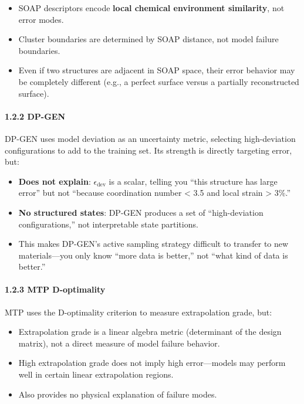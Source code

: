 \documentclass[
  12pt,
]{article}
\providecommand{\tightlist}{%
  \setlength{\itemsep}{0pt}\setlength{\parskip}{0pt}}
\begin{document}
\begin{itemize}
\tightlist
\item
  SOAP descriptors encode \textbf{local chemical environment similarity}, not error modes.
\item
  Cluster boundaries are determined by SOAP distance, not model failure boundaries.
\item
  Even if two structures are adjacent in SOAP space, their error behavior may be completely different (e.g., a perfect surface versus a partially reconstructed surface).
\end{itemize}

\paragraph{1.2.2 DP-GEN}\label{dp-gen}

DP-GEN uses model deviation as an uncertainty metric, selecting high-deviation configurations to add to the training set. Its strength is directly targeting error, but:

\begin{itemize}
\tightlist
\item
  \textbf{Does not explain}: $\epsilon_{\text{dev}}$ is a scalar, telling you ``this structure has large error'' but not ``because coordination number < 3.5 and local strain > 3\%.''
\item
  \textbf{No structured states}: DP-GEN produces a set of ``high-deviation configurations,'' not interpretable state partitions.
\item
  This makes DP-GEN's active sampling strategy difficult to transfer to new materials---you only know ``more data is better,'' not ``what kind of data is better.''
\end{itemize}

\paragraph{1.2.3 MTP D-optimality}\label{mtp-d-optimality}

MTP uses the D-optimality criterion to measure extrapolation grade, but:

\begin{itemize}
\tightlist
\item
  Extrapolation grade is a linear algebra metric (determinant of the design matrix), not a direct measure of model failure behavior.
\item
  High extrapolation grade does not imply high error---models may perform well in certain linear extrapolation regions.
\item
  Also provides no physical explanation of failure modes.
\end{itemize}
\end{document}
